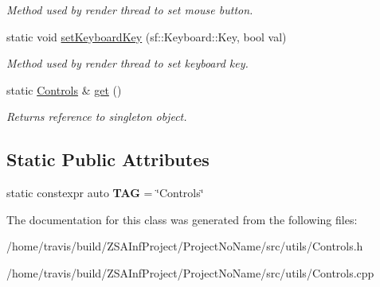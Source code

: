 \begin{DoxyCompactItemize}
\begin{DoxyCompactList}\small\item\em Method used by render thread to set mouse button. \end{DoxyCompactList}\item 
\hypertarget{classControls_a47b500a4326b1876afa64989cedcc2a7}{static void \hyperlink{classControls_a47b500a4326b1876afa64989cedcc2a7}{set\-Keyboard\-Key} (sf\-::\-Keyboard\-::\-Key, bool val)}\label{classControls_a47b500a4326b1876afa64989cedcc2a7}

\begin{DoxyCompactList}\small\item\em Method used by render thread to set keyboard key. \end{DoxyCompactList}\item 
\hypertarget{classControls_ac5617a8cccbde9b6372919318b704a0d}{static \hyperlink{classControls}{Controls} \& \hyperlink{classControls_ac5617a8cccbde9b6372919318b704a0d}{get} ()}\label{classControls_ac5617a8cccbde9b6372919318b704a0d}

\begin{DoxyCompactList}\small\item\em Returns reference to singleton object. \end{DoxyCompactList}\end{DoxyCompactItemize}
\subsection*{Static Public Attributes}
\begin{DoxyCompactItemize}
\item 
\hypertarget{classControls_a734421d88c6b751c34b1555708634961}{static constexpr auto {\bfseries T\-A\-G} = \char`\"{}Controls\char`\"{}}\label{classControls_a734421d88c6b751c34b1555708634961}

\end{DoxyCompactItemize}


The documentation for this class was generated from the following files\-:\begin{DoxyCompactItemize}
\item 
/home/travis/build/\-Z\-S\-A\-Inf\-Project/\-Project\-No\-Name/src/utils/Controls.\-h\item 
/home/travis/build/\-Z\-S\-A\-Inf\-Project/\-Project\-No\-Name/src/utils/Controls.\-cpp\end{DoxyCompactItemize}
